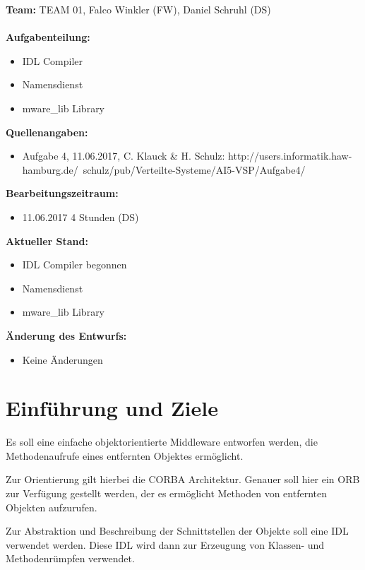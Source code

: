 \documentclass{article}
\begin{document}
\textbf{Team:} TEAM 01, Falco Winkler (FW), Daniel Schruhl (DS)\\
\\
\textbf{Aufgabenteilung:}
\begin{itemize}
    \item IDL Compiler
    \item Namensdienst
    \item mware\_lib Library
\end{itemize}

\textbf{Quellenangaben:}
\begin{itemize}
    \item Aufgabe 4, 11.06.2017, C. Klauck \& H. Schulz: \newline
    http://users.informatik.haw-hamburg.de/~schulz/pub/Verteilte-Systeme/AI5-VSP/Aufgabe4/
\end{itemize}

\textbf{Bearbeitungszeitraum:}
\begin{itemize}
	\item 11.06.2017 4 Stunden (DS)
\end{itemize}

\textbf{Aktueller Stand:}
\begin{itemize}
	\item IDL Compiler begonnen
    \item Namensdienst
    \item mware\_lib Library
\end{itemize}

\textbf{Änderung des Entwurfs:}
\begin{itemize}
    \item Keine Änderungen
\end{itemize}

\newpage

\section{Einführung und Ziele}
Es soll eine einfache objektorientierte Middleware entworfen werden, die Methodenaufrufe
eines entfernten Objektes ermöglicht.

Zur Orientierung gilt hierbei die CORBA Architektur. Genauer soll hier ein ORB zur
Verfügung gestellt werden, der es ermöglicht Methoden von entfernten Objekten aufzurufen.

Zur Abstraktion und Beschreibung der Schnittstellen der Objekte soll eine IDL verwendet werden.
Diese IDL wird dann zur Erzeugung von Klassen- und Methodenrümpfen verwendet.
\end{document}
